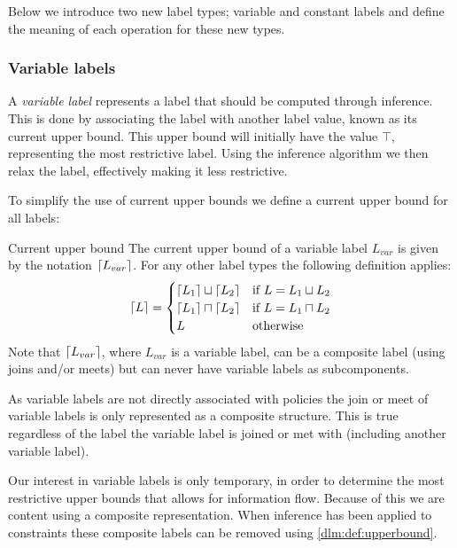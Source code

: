 Below we introduce two new label types; variable and constant labels and define the meaning of each operation for these new types.

\subsubsection{Variable labels}
A \textit{variable label} represents a label that should be computed through inference.
This is done by associating the label with another label value, known as its current upper bound.
This upper bound will initially have the value $\top$, representing the most restrictive label.
Using the inference algorithm we then relax the label, effectively making it less restrictive.

To simplify the use of current upper bounds we define a current upper bound for all labels:

\begin{definition}{Current upper bound}\label{dlm:def:upperbound}
  The current upper bound of a variable label $L_{var}$ is given by the notation $\lceil L_{var}\rceil$.
  For any other label types the following definition applies:
  \[
  \lceil L\rceil =
  \begin{cases}
    \lceil L_1\rceil \sqcup \lceil L_2\rceil & \text{if } L = L_1 \sqcup L_2 \\
    \lceil L_1\rceil \sqcap \lceil L_2\rceil & \text{if } L = L_1 \sqcap L_2 \\
    L & \text{otherwise}
  \end{cases}
  \]
  Note that $\lceil L_{var}\rceil$, where $L_{var}$ is a variable label, can be a composite label (using joins and/or meets) but can never have variable labels as subcomponents.
\end{definition}

As variable labels are not directly associated with policies the join or meet of variable labels is only represented as a composite structure.
This is true regardless of the label the variable label is joined or met with (including another variable label).

Our interest in variable labels is only temporary, in order to determine the most restrictive upper bounds that allows for information flow.
Because of this we are content using a composite representation.
When inference has been applied to constraints these composite labels can be removed using \cref{dlm:def:upperbound}.

